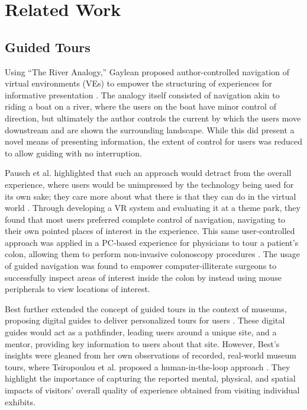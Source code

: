 \section{Related Work}
\subsection{Guided Tours}
Using ``The River Analogy,'' Gaylean proposed author-controlled navigation of virtual environments (VEs) to empower the structuring of experiences for informative presentation \cite{Galyean_GuidedNavigation1995}.
The analogy itself consisted of navigation akin to riding a boat on a river, where the users on the boat have minor control of direction, but ultimately the author controls the current by which the users move downstream and are shown the surrounding landscape.
While this did present a novel means of presenting information, the extent of control for users was reduced to allow guiding with no interruption.

Pausch et al. highlighted that such an approach would detract from the overall experience, where users would be unimpressed by the technology being used for its own sake; they care more about what there is that they can do in the virtual world \cite{Pausch_Aladdin1996}.
Through developing a VR system and evaluating it at a theme park, they found that most users preferred complete control of navigation, navigating to their own pointed places of interest in the experience.
This same user-controlled approach was applied in a PC-based experience for physicians to tour a patient's colon, allowing them to perform non-invasive colonoscopy procedures \cite{Hong_VirtualVoyage1997}.
The usage of guided navigation was found to empower computer-illiterate surgeons to successfully inspect areas of interest inside the colon by instead using mouse peripherals to view locations of interest.

Best further extended the concept of guided tours in the context of museums, proposing digital guides to deliver personalized tours for users \cite{Best_MuseumTours2012}.
These digital guides would act as a pathfinder, leading users around a unique site, and a mentor, providing key information to users about that site.
However, Best's insights were gleaned from her own observations of recorded, real-world museum tours, where Tsiropoulou et al. proposed a human-in-the-loop approach \cite{Tsiropoulou_ExpMuseumTour2017}.
They highlight the importance of capturing the reported mental, physical, and spatial impacts of visitors' overall quality of experience obtained from visiting individual exhibits.\\

